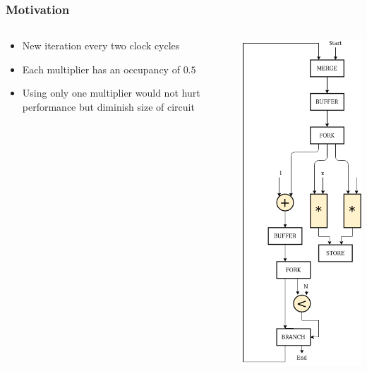 \documentclass{beamer}
\begin{document}
\begin{frame}[fragile]
\frametitle{Motivation}
\begin{columns}[T]
    \begin{column}{0.45\textwidth}
      \begin{itemize}
          \item New iteration every two clock cycles
          \item Each multiplier has an occupancy of $0.5$
          \item Using only one multiplier would not hurt performance but diminish size of circuit
      \end{itemize}
    \end{column}
    \begin{column}{0.45\textwidth}
        \begin{center}
      \includegraphics[scale=0.25]{base_case.png}
    \end{center}
    \end{column}
  \end{columns}
\end{frame}
\end{document}
